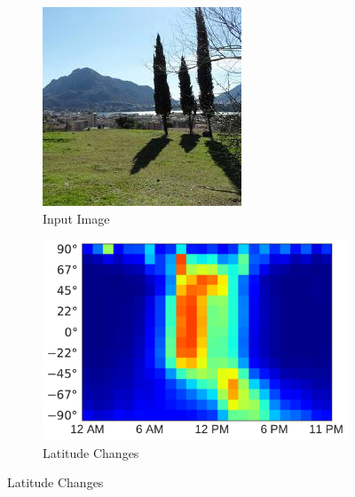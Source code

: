 \documentclass{bmvc2k}
\begin{document}
\begin{figure}
  \centering
  
  \begin{subfigure}[b]{.215\linewidth}
    \includegraphics[width=\linewidth]{time_estimation/49-im}
    \caption{Input Image}
  \end{subfigure}
  \hspace{.25cm}
  \begin{subfigure}[b]{.33\linewidth}
    \includegraphics[width=\linewidth]{time_estimation/49-lat-hour}
    \caption{Latitude Changes}

\end{subfigure}
\end{figure}
\end{document}
